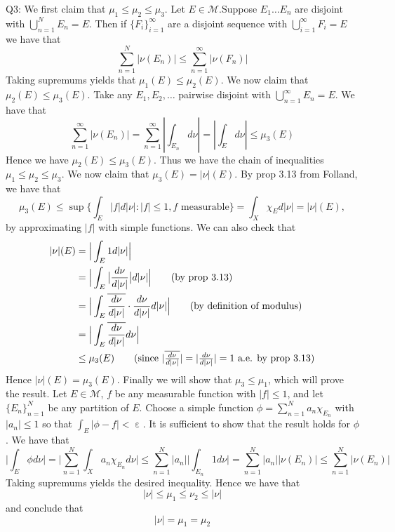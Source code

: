 \documentclass[letterpaper]{article}
\DeclareMathOperator{\ep}{\varepsilon}
\newcommand{\ol}{\overline}
\begin{document}
\noindent
Q3: We first claim that $\mu_1 \leq \mu_2 \leq \mu_3$. Let $E\in \mathcal{M}$.Suppose $E_1 \dots E_n$ are disjoint with $\bigcup_{n=1}^N E_n = E. $ Then if $\{F_i\}_{i=1}^\infty$ are a disjoint sequence with $\bigcup_{i=1}^\infty F_i = E$ we have that $$\sum_{n=1}^N |\nu(E_n)| \leq \sum_{n=1}^\infty |\nu(F_n)|$$
Taking supremums yields that $\mu_1(E) \leq \mu_2(E) $. We now claim that $\mu_2(E)\leq \mu_3(E).$ Take any $E_1, E_2, \dots$ pairwise disjoint with $\bigcup_{n=1}^\infty E_n = E.$ 
We have that $$\sum_{n=1}^\infty |\nu(E_n)| = \sum_{n=1}^\infty |\int_{E_n} d \nu | = |\int_{E} d\nu| \leq \mu_{3}(E)$$
Hence we have $\mu_2(E)\leq \mu_3(E)$. Thus we have the chain of inequalities $\mu_1\leq \mu_2 \leq \mu_3$. We now claim that $\mu_3(E)= |\nu|(E).$ 
By prop 3.13 from Folland, we have that $$\mu_3(E) \leq \sup \Big\{\int_E |f|d|\nu| : |f|\leq 1, f \text{ measurable} \Big\} = \int_{X} \chi_E d|\nu| = |\nu|(E), $$
by approximating $|f|$ with simple functions.
We can also check that
\begin{align*}
    |\nu|(E) & = \Big|\int_E 1 d|\nu| \Big|
    \\ & = \Big| \int_E \big| \frac{d \nu}{d |\nu|} \big| d |\nu|  \Big| \tag{by prop 3.13}
    \\ & = \Big| \int_E \ol{\frac{d \nu}{d|\nu|}} \cdot \frac{d\nu}{d|\nu|} d|\nu| \Big| \tag{by definition of modulus}
    \\ & = \Big| \int_E\ol{\frac{d\nu}{d |\nu|}} d\nu \Big|
    \\ & \leq \mu_3(E) \tag{since $|\ol{\frac{d\nu}{d|\nu|}}| = |\frac{d\nu}{d|\nu|}|=1$ a.e. by prop 3.13}
\end{align*}
Hence $|\nu|(E) = \mu_3(E)$. Finally we will show that $\mu_3 \leq \mu_1$, which will prove the result. Let $E\in \mathcal{M}$, $f$ be any measurable function with $|f|\leq 1$, and let $\{E_n\}_{n=1}^N$ be any partition of $E$. 
Choose a simple function $\phi = \sum_{n=1}^N a_n \chi_{E_n}$ with $|a_n|\leq 1$ so that $\int_E |\phi - f|< \ep$. It is sufficient to show that the result holds for $\phi$. 
We have that $$\Big|\int_E \phi d\nu \Big| = \Big| \sum_{n=1}^N \int_{X} a_n \chi_{E_n} d\nu \Big| \leq \sum_{n=1}^N |a_n| \Big| \int_{E_n} 1 d\nu \Big| = \sum_{n=1}^N |a_n| |\nu(E_n)| \leq \sum_{n=1}^N |\nu(E_n)|$$
Taking supremums yields the desired inequality. Hence we have that $$|\nu|\leq \mu_1 \leq \nu_2 \leq |\nu|$$ and conclude that $$|\nu| = \mu_1 = \mu_2 $$
\end{document}
